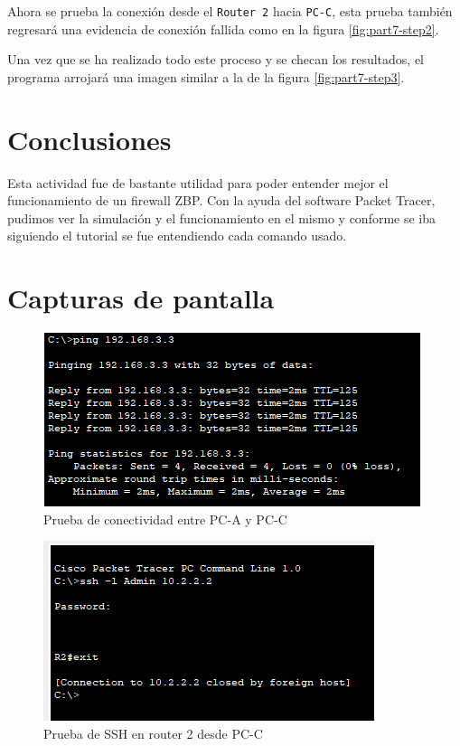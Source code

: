 \documentclass[11pt]{article}
\begin{document}
                Ahora se prueba la conexión desde el \texttt{Router 2} hacia \texttt{PC-C}, esta prueba también regresará una evidencia de conexión fallida como en la figura \ref{fig:part7-step2}.

        Una vez que se ha realizado todo este proceso y se checan los resultados, el programa arrojará una imagen similar a la de la figura \ref{fig:part7-step3}.

    \section{Conclusiones}  
        Esta actividad fue de bastante utilidad para poder entender mejor el funcionamiento de un firewall ZBP. Con la ayuda del software Packet Tracer, pudimos ver la simulación y el funcionamiento en el mismo y conforme se iba siguiendo el tutorial se fue entendiendo cada comando usado.
    
    \clearpage
    
    

    \appendix
    \section{Capturas de pantalla}

        \begin{figure}[!h]
            \centering
            \includegraphics[scale=0.9]{img/part1-step1.png}
            \caption{Prueba de conectividad entre PC-A y PC-C}
            \label{fig:part1-step1}
        \end{figure}

        \begin{figure}[!h]
            \centering
            \includegraphics[scale=0.9]{img/part1-step2.png}
            \caption{Prueba de SSH en router 2 desde PC-C}
            \label{fig:part1-step2}
        \end{figure}
\end{document}
